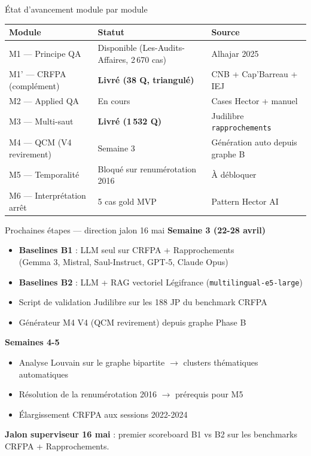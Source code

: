 \documentclass[aspectratio=169,10pt]{beamer}
\newcommand{\keybox}[1]{%
  \begin{center}
  \colorbox{accentsoft}{\parbox{0.92\linewidth}{\centering #1}}
  \end{center}}
\begin{document}
\begin{frame}{État d'avancement module par module}
  \footnotesize
  \renewcommand{\arraystretch}{1.15}
  \begin{tabular}{@{}l l l@{}}
    \toprule
    \textbf{Module} & \textbf{Statut} & \textbf{Source} \\
    \midrule
    M1  --- Principe QA             & \textcolor{ok}{Disponible (Les-Audits-Affaires, 2\,670 cas)} & Alhajar 2025 \\
    M1' --- CRFPA (complément)      & \textcolor{ok}{\textbf{Livré (38 Q, triangulé)}}   & CNB + Cap'Barreau + IEJ \\
    M2  --- Applied QA              & En cours                                           & Cases Hector + manuel \\
    M3  --- Multi-saut              & \textcolor{ok}{\textbf{Livré (1\,532 Q)}}          & Judilibre \texttt{rapprochements} \\
    M4  --- QCM (V4 revirement)     & Semaine 3                                          & Génération auto depuis graphe B \\
    M5  --- Temporalité             & Bloqué sur renumérotation 2016                     & À débloquer \\
    M6  --- Interprétation arrêt    & \textcolor{ok}{5 cas gold MVP}                     & Pattern Hector AI \\
    \bottomrule
  \end{tabular}
\end{frame}

\begin{frame}{Prochaines étapes --- direction jalon 16 mai}
  \textbf{Semaine 3 (22-28 avril)}
  \begin{itemize}\footnotesize
    \item \textbf{Baselines B1} : LLM seul sur CRFPA + Rapprochements \\ (Gemma 3, Mistral, Saul-Instruct, GPT-5, Claude Opus)
    \item \textbf{Baselines B2} : LLM + RAG vectoriel Légifrance (\texttt{multilingual-e5-large})
    \item Script de validation Judilibre sur les 188 JP du benchmark CRFPA
    \item Générateur M4 V4 (QCM revirement) depuis graphe Phase B
  \end{itemize}

  \vspace{0.3em}
  \textbf{Semaines 4-5}
  \begin{itemize}\footnotesize
    \item Analyse Louvain sur le graphe bipartite $\rightarrow$ clusters thématiques automatiques
    \item Résolution de la renumérotation 2016 $\rightarrow$ prérequis pour M5
    \item Élargissement CRFPA aux sessions 2022-2024
  \end{itemize}

  \vspace{0.3em}
  \keybox{\small \textbf{Jalon superviseur 16 mai} : premier scoreboard B1 vs B2 sur les benchmarks CRFPA + Rapprochements.}
\end{frame}
\end{document}
